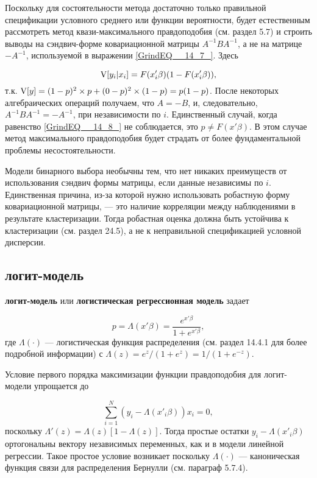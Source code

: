 Поскольку для состоятельности метода достаточно только правильной спецификации условного среднего или функции вероятности,  будет естественным рассмотреть метод квази-максимального правдоподобия (см. раздел 5.7) и строить выводы на сэндвич-форме ковариационной матрицы $A^{-1}BA^{-1}$, а не на матрице $-A^{-1}$,  используемой в выражении \eqref{GrindEQ__14_7_}. Здесь

\begin{equation} 
\label{GrindEQ__14_8_} 
\mathrm{V} [y_i| x_i]= F(x'_i\beta)(1-F(x'_i\beta)),  
\end{equation} 
т.к. $\mathrm{V}[y]=(1-p)^2 \times p + (0-p)^2 \times (1-p) = p(1-p)$. После некоторых алгебраических операций получаем,  что $A=-B$, и,  следовательно,  $A^{-1}BA^{-1}=-A^{-1}$,  при независимости по $i$. Единственный случай,  когда равенство \eqref{GrindEQ__14_8_} не соблюдается,  это $p\ne F(x'\beta)$. В этом случае метод максимального правдоподобия будет страдать от более фундаментальной проблемы несостоятельности.

Модели бинарного выбора необычны тем,  что нет никаких преимуществ от использования сэндвич формы матрицы,  если данные независимы по $i$. Единственная причина, из-за которой нужно использовать робастную  форму ковариационной матрицы, --- это наличие корреляции между наблюдениями в результате кластеризации. Тогда робастная оценка должна  быть устойчива к кластеризации (см. раздел 24.5), а не к неправильной спецификацией условной дисперсии.

\subsection{логит-модель}

\textbf{логит-модель} или \textbf{логистическая регрессионная модель} задает

\begin{equation} 
\label{GrindEQ__14_9_} 
p=\Lambda \left(x'\beta \right)=\frac{e^{x'\beta }}{1+e^{x'\beta }},  
\end{equation} 
где $\Lambda (\cdot)$ --- логистическая функция распределения (см. раздел 14.4.1 для более подробной информации) с $\Lambda \left(z\right)={e^z}/{\left(1+e^z\right)={1}/{(1+e^{-z})}}.$

Условие первого порядка максимизации функции правдоподобия для логит-модели упрощается до

\begin{equation} 
\label{GrindEQ__14_10_} 
\sum^N_{i=1} (y_i-\Lambda (x'_i\beta))x_i=0,  
\end{equation} 
поскольку $\Lambda'(z)=\Lambda (z)[1-\Lambda (z)]$.
Тогда простые остатки $y_i-\Lambda (x'_i\beta)$ ортогональны  вектору независимых переменных,  как и в модели линейной регрессии. Такое простое условие возникает поскольку $\Lambda (\cdot)$ --- каноническая функция связи для распределения Бернулли (см. параграф 5.7.4).

